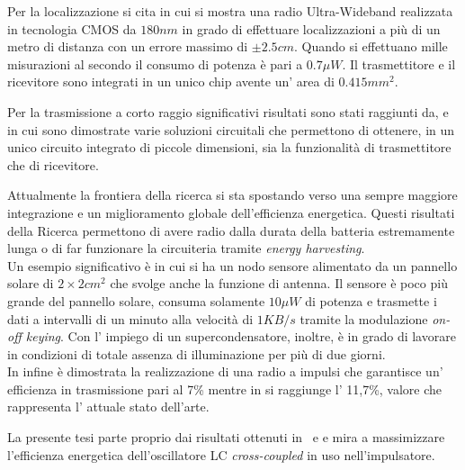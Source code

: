 \documentclass[a4paper, 12pt]{memoir}
\begin{document}
Per la localizzazione si cita\cite{Terada05} in cui si mostra una radio 
Ultra-Wideband realizzata in tecnologia CMOS da $ 180nm $ in grado di
effettuare localizzazioni a più di un metro di distanza con un errore massimo
di $ \pm 2.5cm $.
Quando si effettuano mille misurazioni al secondo il consumo di potenza è pari
a $ 0.7\mu W $. Il trasmettitore e il ricevitore sono integrati in un unico
chip avente un' area di $ 0.415mm^2 $.

Per la trasmissione a corto raggio significativi risultati sono stati raggiunti
da\cite{RabaeyEECS},\cite{Neviani12} e\cite{Gambini12} in cui sono dimostrate
varie soluzioni circuitali che permettono di ottenere, in un unico circuito
integrato di piccole dimensioni, sia la funzionalità di trasmettitore che di
ricevitore.

Attualmente la frontiera della ricerca si sta spostando verso una sempre
maggiore integrazione e un miglioramento globale dell'efficienza energetica.
Questi risultati della Ricerca permettono di avere radio dalla durata della 
batteria estremamente lunga o di far funzionare la circuiteria tramite
\emph{energy harvesting}.\\
Un esempio significativo è\cite{Danesh11} in cui si ha un nodo sensore 
alimentato da un pannello solare di $ 2\times2 cm^2 $ che svolge anche la
funzione di antenna. Il sensore è poco più grande del pannello solare, consuma
solamente $ 10\mu W $ di potenza e trasmette i dati a intervalli di un
minuto alla velocità di $ 1 KB/s $ tramite la modulazione \emph{on-off
keying}.
Con l' impiego di un supercondensatore, inoltre, è in grado di lavorare in
condizioni di totale assenza di illuminazione per più di due giorni.\\
In\cite{Solda10} infine è dimostrata la realizzazione di una radio a impulsi 
che garantisce un' efficienza in trasmissione pari al 7\% mentre in 
\cite{Neviani14} si raggiunge l' 11,7\%, valore che rappresenta l' attuale
stato dell'arte.

La presente tesi parte proprio dai risultati ottenuti in~\cite{Neviani12} e
\cite{Neviani14} e mira a massimizzare l'efficienza energetica dell'oscillatore
LC \emph{cross-coupled} in uso nell'impulsatore.
\end{document}
